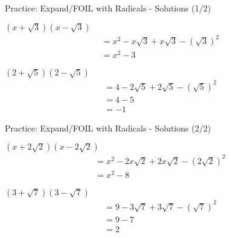 \documentclass[aspectratio=169]{beamer}
\begin{document}
\begin{frame}{Practice: Expand/FOIL with Radicals - Solutions (1/2)}
\begin{tcolorbox}[colback=lightgray,colframe=primary,title=Solutions]
\footnotesize

$(x+\sqrt{3})(x-\sqrt{3})$
\begin{align*}
  &= x^2 - x\sqrt{3} + x\sqrt{3} - (\sqrt{3})^2 \\
  &= x^2 - 3
\end{align*}

$(2+\sqrt{5})(2-\sqrt{5})$
\begin{align*}
  &= 4 - 2\sqrt{5} + 2\sqrt{5} - (\sqrt{5})^2 \\
  &= 4 - 5 \\
  &= -1
\end{align*}

\end{tcolorbox}
\end{frame}

\begin{frame}{Practice: Expand/FOIL with Radicals - Solutions (2/2)}
\begin{tcolorbox}[colback=lightgray,colframe=primary,title=Solutions]
\footnotesize

$(x+2\sqrt{2})(x-2\sqrt{2})$
\begin{align*}
  &= x^2 - 2x\sqrt{2} + 2x\sqrt{2} - (2\sqrt{2})^2 \\
  &= x^2 - 8
\end{align*}

$(3+\sqrt{7})(3-\sqrt{7})$
\begin{align*}
  &= 9 - 3\sqrt{7} + 3\sqrt{7} - (\sqrt{7})^2 \\
  &= 9 - 7 \\
  &= 2
\end{align*}

\end{tcolorbox}
\end{frame}
\end{document}
